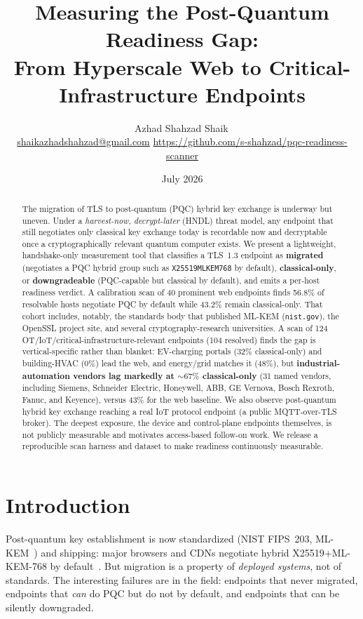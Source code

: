 \documentclass[11pt]{article}
\title{Measuring the Post-Quantum Readiness Gap:\\
From Hyperscale Web to Critical-Infrastructure Endpoints}
\author{Azhad Shahzad Shaik\,\orcidlink{0009-0009-6450-5837}\\
\small \href{mailto:shaikazhadshahzad@gmail.com}{shaikazhadshahzad@gmail.com} \quad
\small \url{https://github.com/s-shahzad/pqc-readiness-scanner}}
\date{July 2026}
\newcommand{\code}[1]{\texttt{#1}}
\begin{document}
\maketitle

\begin{abstract}
The migration of TLS to post-quantum (PQC) hybrid key exchange is underway but uneven.
Under a \emph{harvest-now, decrypt-later} (HNDL) threat model, any endpoint that still
negotiates only classical key exchange today is recordable now and decryptable once a
cryptographically relevant quantum computer exists. We present a lightweight,
handshake-only measurement tool that classifies a TLS~1.3 endpoint as \textbf{migrated}
(negotiates a PQC hybrid group such as \code{X25519MLKEM768} by default),
\textbf{classical-only}, or \textbf{downgradeable} (PQC-capable but classical by
default), and emits a per-host readiness verdict. A calibration scan of 40 prominent web
endpoints finds 56.8\% of resolvable hosts negotiate PQC by default while 43.2\% remain
classical-only. That cohort includes, notably, the standards body that published ML-KEM
(\code{nist.gov}), the OpenSSL project site, and several cryptography-research
universities. A scan of 124 OT/IoT/critical-infrastructure-relevant endpoints (104
resolved) finds the gap is vertical-specific rather than blanket: EV-charging portals
(32\% classical-only) and building-HVAC (0\%) lead the web, and energy/grid matches it
(48\%), but \textbf{industrial-automation vendors lag markedly at ${\sim}67\%$
classical-only} (31 named vendors, including Siemens, Schneider Electric, Honeywell,
ABB, GE Vernova, Bosch Rexroth, Fanuc, and Keyence), versus 43\% for the web baseline.
We also observe post-quantum hybrid key exchange reaching a real IoT protocol endpoint
(a public MQTT-over-TLS broker). The deepest exposure, the device and control-plane
endpoints themselves, is not publicly measurable and motivates access-based follow-on
work. We release a
reproducible scan harness and dataset to make readiness continuously measurable.
\end{abstract}

\section{Introduction}

Post-quantum key establishment is now standardized (NIST FIPS~203,
ML-KEM~\cite{fips203}) and shipping: major browsers and CDNs negotiate hybrid
X25519+ML-KEM-768 by default~\cite{westerbaan2024state}. But migration is a property of
\emph{deployed systems}, not of standards. The interesting failures are in the field:
endpoints that never migrated, endpoints that \emph{can} do PQC but do not by default,
and endpoints that can be silently downgraded.
\end{document}
